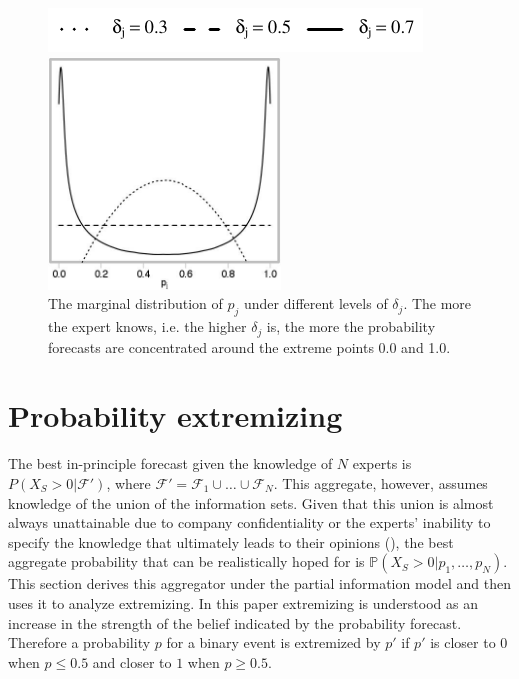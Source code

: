\documentclass[11pt]{article}
\renewcommand{\P}{\mathbb{P}}
\theoremstyle{definition}
\theoremstyle{definition}
\begin{document}
\begin{figure}[t]
\centering
	\hspace{0em}\includegraphics{LegendMarginal}

 \includegraphics[width= 0.55\textwidth]{Marginals}
   \caption{The marginal distribution of $p_j$ under different levels of $\delta_j$. The more the expert knows, i.e. the higher $\delta_j$ is, the more the probability forecasts are concentrated around the extreme points 0.0 and 1.0.}
\label{marginals}
\end{figure}


\section{Probability extremizing}
\label{extremizing}
The best in-principle forecast given the knowledge of $N$ experts is $P(X_{S} > 0 |  \mathcal{F}')$, where $\mathcal{F}' = \mathcal{F}_1 \cup \dots \cup \mathcal{F}_N$. This aggregate, however, assumes knowledge of the union of the information sets. Given that this union is almost always unattainable due to company confidentiality or the experts' inability to specify the knowledge that ultimately leads to their opinions (\cite{dawid1995coherent}), the best aggregate probability that can be realistically hoped for is  $\P(X_{S} > 0 | p_1, \dots, p_N)$. This section derives this aggregator under the partial information model and then uses it to analyze extremizing.  In this paper extremizing is understood as an increase in the strength of the belief indicated by the probability forecast. Therefore a probability $p$ for a binary event is extremized by $p'$ if $p'$ is closer to $0$ when $p \leq 0.5$ and closer to $1$ when $p \geq 0.5$.  
\end{document}
